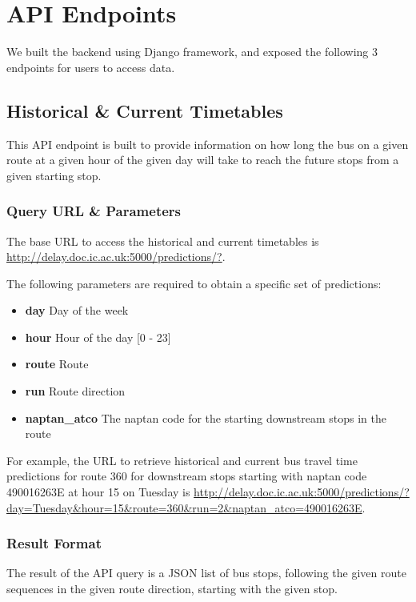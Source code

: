 \section{API Endpoints}
\par We built the backend using Django framework, and exposed the following 3 endpoints for users to access data.

\subsection{Historical \& Current Timetables}
\par This API endpoint is built to provide information on how long the bus on a given route at a given hour of the given day will take to reach the future stops from a given starting stop.

\subsubsection{Query URL \& Parameters}
\par The base URL to access the historical and current timetables is \url{http://delay.doc.ic.ac.uk:5000/predictions/?}.

\par The following parameters are required to obtain a specific set of predictions:
\begin{itemize}
  \item \textbf{day} Day of the week
  \item \textbf{hour} Hour of the day [0 - 23]
  \item \textbf{route} Route
  \item \textbf{run} Route direction
  \item \textbf{naptan\_atco} The \gls{naptan} code for the starting downstream stops in the route
\end{itemize}

\par For example, the URL to retrieve historical and current bus travel time predictions for route 360 for downstream stops starting with \gls{naptan} code 490016263E at hour 15 on Tuesday is \url{http://delay.doc.ic.ac.uk:5000/predictions/?day=Tuesday&hour=15&route=360&run=2&naptan_atco=490016263E}.

\subsubsection{Result Format}
\par The result of the API query is a JSON list of bus stops, following the given route sequences in the given route direction, starting with the given stop.

